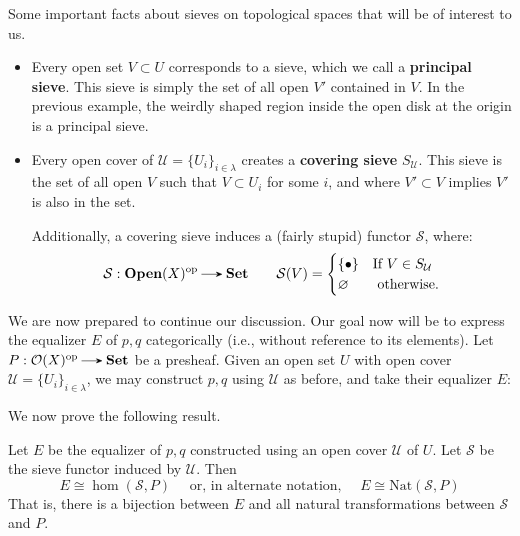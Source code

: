 Some important facts about sieves on topological spaces that will be of interest to us.
\begin{itemize}
    \item Every open set $V \subset U$ corresponds to a sieve, which we call a \textbf{principal sieve}. 
    This sieve is simply the set of all open $V'$ contained in $V$. In the previous example, 
    the weirdly shaped region inside the open disk at the origin is a principal sieve.

    \item Every open cover of $\mathcal{U} = \{U_i\}_{i \in \lambda}$
    creates a \textbf{covering sieve} $S_{\mathcal{U}}$. This sieve is the set of all open $V$ such that $V \subset U_i$ 
    for some $i$, and where $V' \subset V$ implies $V'$ is also in the set. 
    
    Additionally, a covering sieve induces a (fairly stupid) functor
    $\mathcal{S}$, where:
    \[
        \mathcal{S}: \textbf{Open}(X)\op \to \textbf{Set}
        \qquad
        \mathcal{S}(V) 
        = 
        \begin{cases}
            \{\bullet\} & \text{If } V \in S_{\mathcal{U}}\\
            \varnothing & \text{ otherwise.}
        \end{cases}
    \]    
\end{itemize}

We are now prepared to continue our discussion. Our goal now will be to express 
the equalizer $E$ of $p, q$ categorically (i.e., without reference to its elements).
Let $P: \mathcal{O}(X)\op \to \textbf{Set}$ be a presheaf. Given an open set 
$U$ with open cover $\mathcal{U} = \{U_i\}_{i \in \lambda}$, we may construct 
$p, q$ using $\mathcal{U}$ as before, and take their equalizer $E$:
\begin{center}
\end{center}

We now prove the following result. 
\begin{lemma}
    Let $E$ be the equalizer of $p, q$ constructed using an open cover $\mathcal{U}$ of $U$. 
    Let $\mathcal{S}$ be the sieve functor induced by $\mathcal{U}$. Then
    \[
        E \cong \hom(\mathcal{S}, P) \quad \text{ or, in alternate notation, } \quad E \cong \text{Nat}(\mathcal{S}, P)
    \]
    That is, there is a bijection between $E$ and all natural transformations between $\mathcal{S}$ and $P$. 
\end{lemma}

